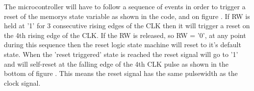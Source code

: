 The microcontroller will have to follow a sequence of events in order to trigger a reset of the memorys state variable as shown in the code, and on figure . If RW is held at '1' for 3 consecutive rising edges of the CLK then it will trigger a reset on the 4th rising edge of the CLK. If the RW is released, so RW = '0', at any point during this sequence then the reset logic state machine will reset to it's default state. When the 'reset triggered' state is reached the reset signal will go to '1' and will self-reset at the falling edge of the 4th CLK pulse as shown in the bottom of figure . This means the reset signal has the same pulsewidth as the clock signal.
